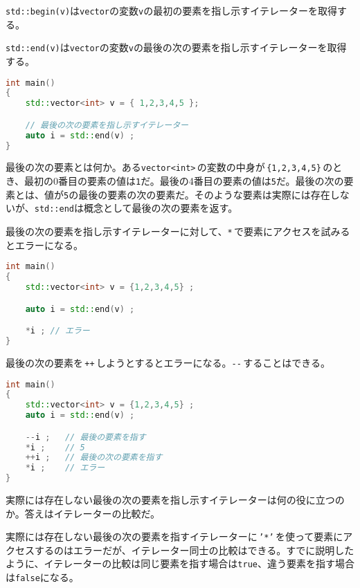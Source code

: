 
\texttt{std::begin(v)}は\texttt{vector}の変数\texttt{v}の最初の要素を指し示すイテレーターを取得する。

\texttt{std::end(v)}は\texttt{vector}の変数\texttt{v}の最後の次の要素を指し示すイテレーターを取得する。

\begin{lstlisting}[language={C++}]
int main()
{
    std::vector<int> v = { 1,2,3,4,5 };

    // 最後の次の要素を指し示すイテレーター
    auto i = std::end(v) ;
}
\end{lstlisting}

最後の次の要素とは何か。ある\texttt{vector<int>}\,の変数の中身が\,\texttt{\{1,2,3,4,5\}}\,のとき、最初の0番目の要素の値は\texttt{1}だ。最後の4番目の要素の値は\texttt{5}だ。最後の次の要素とは、値が\texttt{5}の最後の要素の次の要素だ。そのような要素は実際には存在しないが、\texttt{std::end}は概念として最後の次の要素を返す。

最後の次の要素を指し示すイテレーターに対して、\texttt{*}\,で要素にアクセスを試みるとエラーになる。

\begin{lstlisting}[language={C++}]
int main()
{
    std::vector<int> v = {1,2,3,4,5} ;

    auto i = std::end(v) ;

    *i ; // エラー
}
\end{lstlisting}

最後の次の要素を\,\texttt{++}\,しようとするとエラーになる。\texttt{{-}{-}}\,することはできる。

\begin{lstlisting}[language={C++}]
int main()
{
    std::vector<int> v = {1,2,3,4,5} ;
    auto i = std::end(v) ;

    --i ;   // 最後の要素を指す
    *i ;    // 5
    ++i ;   // 最後の次の要素を指す
    *i ;    // エラー
}
\end{lstlisting}

実際には存在しない最後の次の要素を指し示すイテレーターは何の役に立つのか。答えはイテレーターの比較だ。

実際には存在しない最後の次の要素を指すイテレーターに\,\texttt{'*'}\,を使って要素にアクセスするのはエラーだが、イテレーター同士の比較はできる。すでに説明したように、イテレーターの比較は同じ要素を指す場合は\texttt{true}、違う要素を指す場合は\texttt{false}になる。

